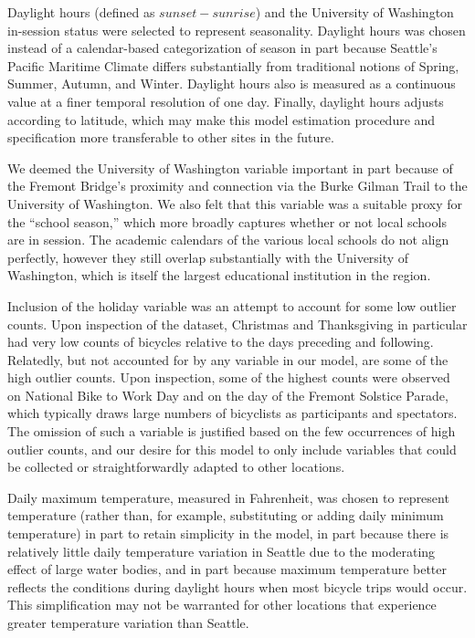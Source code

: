 \documentclass[12pt,letterpaper,article,twocolumn]{memoir}
\begin{document}
Daylight hours (defined as $sunset - sunrise$) and the University of
Washington in-session status were selected to represent seasonality.
Daylight hours was chosen instead of a calendar-based categorization
of season in part because Seattle's Pacific Maritime Climate differs
substantially from traditional notions of Spring, Summer, Autumn, and
Winter. Daylight hours also is measured as a continuous value at a
finer temporal resolution of one day. Finally, daylight hours adjusts
according to latitude, which may make this model estimation procedure
and specification more transferable to other sites in the future.

We deemed the University of Washington variable important in part
because of the Fremont Bridge's proximity and connection via the Burke
Gilman Trail to the University of Washington. We also felt that this
variable was a suitable proxy for the ``school season,'' which more
broadly captures whether or not local schools are in session. The
academic calendars of the various local schools do not align
perfectly, however they still overlap substantially with the
University of Washington, which is itself the largest educational
institution in the region.

Inclusion of the holiday variable was an attempt to account for
some low outlier counts. Upon inspection of the dataset, Christmas and
Thanksgiving in particular had very low counts of bicycles relative to
the days preceding and following. Relatedly, but not accounted for by
any variable in our model, are some of the high outlier counts. Upon
inspection, some of the highest counts were observed on National Bike
to Work Day and on the day of the Fremont Solstice Parade, which
typically draws large numbers of bicyclists as participants and
spectators. The omission of such a variable is justified based on the
few occurrences of high outlier counts, and our desire for this model
to only include variables that could be collected or straightforwardly
adapted to other locations.

Daily maximum temperature, measured in Fahrenheit, was chosen to
represent temperature (rather than, for example, substituting or
adding daily minimum temperature) in part to retain simplicity in the
model, in part because there is relatively little daily temperature
variation in Seattle due to the moderating effect of large water
bodies, and in part because maximum temperature better reflects the
conditions during daylight hours when most bicycle trips would occur.
This simplification may not be warranted for other locations that
experience greater temperature variation than Seattle.
\end{document}
